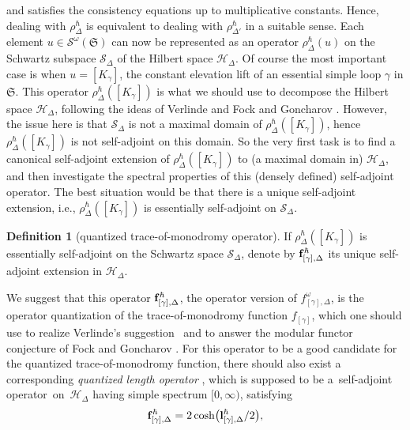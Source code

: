 \documentclass[10pt,a4paper]{amsart}
\numberwithin{equation}{section}
\theoremstyle{definition}
\newtheorem{Definition}[Theorem]{Definition}
\begin{document}
and satisfies the consistency equations  up to multiplicative constants. Hence, dealing with $\rho^\hbar_\Delta$ is equivalent to dealing with $\rho^\hbar_{\Delta'}$ in a suitable sense.
Each element $u \in \mathcal{S}^\omega(\mathfrak{S})$ can now be represented as an operator $\rho^\hbar_\Delta(u)$ on the Schwartz subspace $\mathscr{S}_\Delta$ of the Hilbert space $\mathscr{H}_\Delta$. Of course the most important case is when $u = [K_\gamma]$, the constant elevation lift of an essential simple loop $\gamma$ in $\mathfrak{S}$. This operator $\rho^\hbar_\Delta([K_\gamma])$ is what we should use to decompose the Hilbert space $\mathscr{H}_\Delta$, following the ideas of Verlinde \cite{Verlinde} and Fock and Goncharov \cite{FG09}. However, the issue here is that $\mathscr{S}_\Delta$ is not a maximal domain of $\rho^\hbar_\Delta([K_\gamma])$, hence $\rho^\hbar_\Delta([K_\gamma])$ is not self-adjoint on this domain. So the very first task is to find a canonical self-adjoint extension of $\rho^\hbar_\Delta([K_\gamma])$ to (a maximal domain in) $\mathscr{H}_\Delta$, and then investigate the spectral properties of this (densely defined) self-adjoint operator. The best situation would be that there is a unique self-adjoint extension, i.e., $\rho^\hbar_\Delta([K_\gamma])$ is essentially self-adjoint on $\mathscr{S}_\Delta$.
\begin{Definition}[quantized trace-of-monodromy operator]
If $\rho^\hbar_\Delta([K_\gamma])$ is essentially self\nobreakdash-ad\-joint on the Schwartz space $\mathscr{S}_\Delta$, denote by ${\bf f}^\hbar_{[\gamma],\Delta}$ its unique self-adjoint extension in $\mathscr{H}_\Delta$.
\end{Definition}
We suggest that this operator ${\bf f}^\hbar_{[\gamma],\Delta}$, the operator version of $f^\omega_{[\gamma],\Delta}$, is the operator quantization of the trace-of-monodromy function $f_{[\gamma]}$, which one should use to realize Verlinde's suggestion~\cite{Verlinde} and to answer the modular functor conjecture of Fock and Goncharov \cite{FG09, F97}. For this operator to be a good candidate for the quantized trace-of-monodromy function, there should also exist a corresponding {\em quantized length operator} , which is supposed to be a~self-adjoint opera\-tor~on~$\mathscr{H}_\Delta$ having simple spectrum $[0,\infty)$, satisfying
\begin{align}
\label{eq:l_hbar_operator_definition}
{\bf f}^\hbar_{[\gamma],\Delta} = 2\cosh \bigl({\bf l}^\hbar_{[\gamma],\Delta}/2\bigr),
\end{align}
\end{document}
